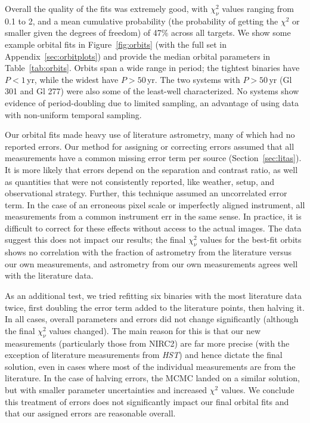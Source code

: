\documentclass[twocolumn]{aastex62}
\begin{document}
Overall the quality of the fits was extremely good, with $\chi^2_\nu$ values ranging from 0.1 to 2, and a mean cumulative probability (the probability of getting the $\chi^2$ or smaller given the degrees of freedom) of 47\% across all targets. We show some example orbital fits in Figure~\ref{fig:orbits} (with the full set in Appendix~\ref{sec:orbitplots}) and provide the median orbital parameters in Table~\ref{tab:orbits}. Orbits span a wide range in period; the tightest binaries have $P<1$\,yr, while the widest have $P>50$\,yr. The two systems with $P>50$\,yr (Gl 301 and Gl 277) were also some of the least-well characterized. No systems show evidence of period-doubling due to limited sampling, an advantage of using data with non-uniform temporal sampling.

Our orbital fits made heavy use of literature astrometry, many of which had no reported errors. Our method for assigning or correcting errors assumed that all measurements have a common missing error term per source (Section~\ref{sec:litas}). It is more likely that errors depend on the separation and contrast ratio, as well as quantities that were not consistently reported, like weather, setup, and observational strategy. Further, this technique assumed an uncorrelated error term. In the case of an erroneous pixel scale or imperfectly aligned instrument, all measurements from a common instrument err in the same sense. In practice, it is difficult to correct for these effects without access to the actual images. The data suggest this does not impact our results; the final $\chi^2_\nu$ values for the best-fit orbits shows no correlation with the fraction of astrometry from the literature versus our own measurements, and astrometry from our own measurements agrees well with the literature data. 

As an additional test, we tried refitting six binaries with the most literature data twice, first doubling the error term added to the literature points, then halving it. In all cases, overall parameters and errors did not change significantly (although the final $\chi^2_\nu$ values changed). The main reason for this is that our new measurements (particularly those from NIRC2) are far more precise (with the exception of literature measurements from {\it HST}) and hence dictate the final solution, even in cases where most of the individual measurements are from the literature. In the case of halving errors, the MCMC landed on a similar solution, but with smaller parameter uncertainties and increased $\chi^2$ values. We conclude this treatment of errors does not significantly impact our final orbital fits and that our assigned errors are reasonable overall.
\end{document}

